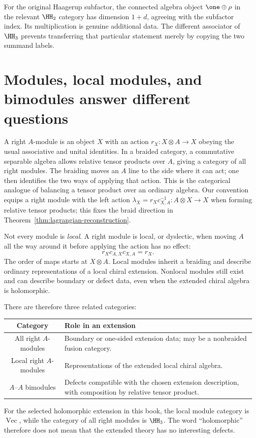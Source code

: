 For the original Haagerup subfactor, the connected algebra object
$\one\oplus\rho$ in the relevant $\HH_2$ category has
dimension $1+d$, agreeing with the subfactor index.  Its multiplication
is genuine additional data.  The different associator of $\HH_3$
prevents transferring that particular statement merely by copying
the two summand labels.

\section{Modules, local modules, and bimodules answer different questions}

A right $A$-module is an object $X$ with an action
$r_X:X\otimes A\to X$ obeying the usual associative and unital
identities.  In a braided category, a commutative separable algebra
allows relative tensor products over $A$, giving a category of all
right modules.  The braiding moves an $A$ line to the side where it
can act; one then identifies the two ways of applying that action.
This is the categorical analogue of balancing a tensor product over
an ordinary algebra.
Our convention equips a right module with the left action
$\lambda_X=r_Xc_{X,A}^{-1}:A\otimes X\to X$ when forming
relative tensor products; this fixes the braid direction in
Theorem~\ref{thm:lagrangian-reconstruction}.

Not every module is \emph{local}.  A right module is local, or
dyslectic, when moving $A$ all the way around it before applying
the action has no effect:
\begin{equation}
 r_X c_{A,X}c_{X,A}=r_X.
 \label{eq:local-module-condition}
\end{equation}
The order of maps starts at $X\otimes A$.  Local modules inherit
a braiding and describe ordinary representations of a local chiral
extension.  Nonlocal modules still exist and can describe boundary
or defect data, even when the extended chiral algebra is holomorphic.

There are therefore three related categories:
\begin{center}
\begin{tabular}{c|p{}}
Category & Role in an extension\\\hline
All right $A$-modules & Boundary or one-sided extension data;
may be a nonbraided fusion category.\\
Local right $A$-modules & Representations of the extended local
chiral algebra.\\
$A$--$A$ bimodules & Defects compatible with the chosen extension
description, with composition by relative tensor product.
\end{tabular}
\end{center}
For the selected holomorphic extension in this book, the local
module category is $\operatorname{Vec}$, while the category of all
right modules is $\HH_3$.  The word ``holomorphic'' therefore does
not mean that the extended theory has no interesting defects.

